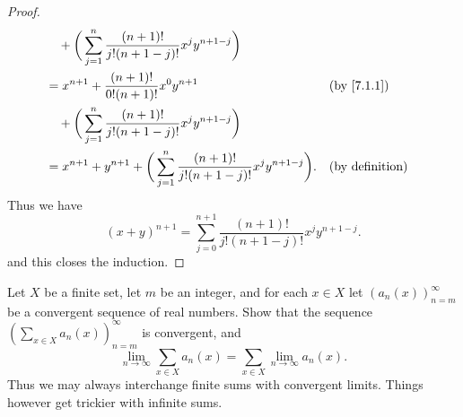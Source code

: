 \begin{proof}
\begin{align*}
     & \quad + \bigg(\sum_{j = 1}^n \dfrac{(n + 1)!}{j!(n + 1 - j)!} x^j y^{n + 1 - j}\bigg)                                                                     \\
     & = x^{n + 1} + \dfrac{(n + 1)!}{0! (n + 1)!} x^0 y^{n + 1}                                                                     &  & \by{7.1.1}             \\
     & \quad + \bigg(\sum_{j = 1}^n \dfrac{(n + 1)!}{j!(n + 1 - j)!} x^j y^{n + 1 - j}\bigg)                                                                     \\
     & = x^{n + 1} + y^{n + 1} + \bigg(\sum_{j = 1}^n \dfrac{(n + 1)!}{j!(n + 1 - j)!} x^j y^{n + 1 - j}\bigg).                      &  & \text{(by definition)}
  \end{align*}
  Thus we have
  \[
    (x + y)^{n + 1} = \sum_{j = 0}^{n + 1} \dfrac{(n + 1)!}{j!(n + 1 - j)!} x^j y^{n + 1 - j}.
  \]
  and this closes the induction.
\end{proof}

\begin{ex}\label{ex:7.1.5}
  Let \(X\) be a finite set, let \(m\) be an integer, and for each \(x \in X\) let \((a_n(x))_{n = m}^\infty\) be a convergent sequence of real numbers.
  Show that the sequence \((\sum_{x \in X} a_n(x))_{n = m}^\infty\) is convergent, and
  \[
    \lim_{n \to \infty} \sum_{x \in X} a_n(x) = \sum_{x \in X} \lim_{n \to \infty} a_n(x).
  \]
  Thus we may always interchange finite sums with convergent limits.
  Things however get trickier with infinite sums.
\end{ex}

